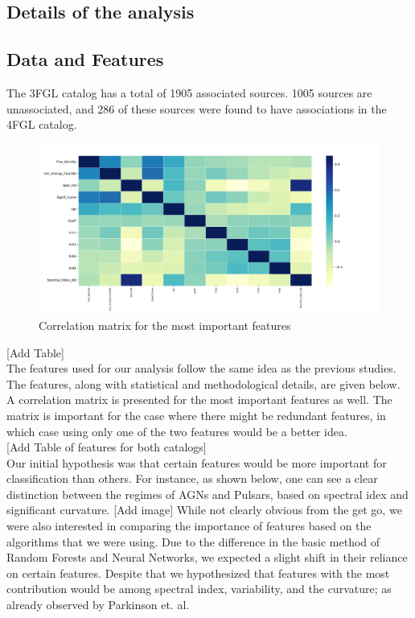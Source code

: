 \subsection{Details of the analysis}

\subsection{Data and Features}

The 3FGL catalog has a total of 1905 associated sources. 1005 sources are unassociated, and 286 of these sources were found to have associations in the 4FGL catalog. \\
\begin{figure}[h]
\includegraphics[width=\onepic\textwidth]{plots/correlation.pdf}
\caption{Correlation matrix for the most important features}
\label{fig:corr}
\end{figure}
[Add Table]\\

The features used for our analysis follow the same idea as the previous studies. The features, along with statistical and methodological details, are given below. A correlation matrix is presented for the most important features as well. The matrix is important for the case where there might be redundant features, in which case using only one of the two features would be a better idea.\\



[Add Table of features for both catalogs]\\

Our initial hypothesis was that certain features would be more important for classification than others. For instance, as shown below, one can see a clear distinction between the regimes of AGNs and Pulsars, based on spectral idex and significant curvature. [Add image] While not clearly obvious from the get go, we were also interested in comparing the importance of features based on the algorithms that we were using. Due to the difference in the basic method of Random Forests and Neural Networks, we expected a slight shift in their reliance on certain features. Despite that we hypothesized that features with the most contribution would be among spectral index, variability, and the curvature; as already observed by Parkinson et. al.\\

